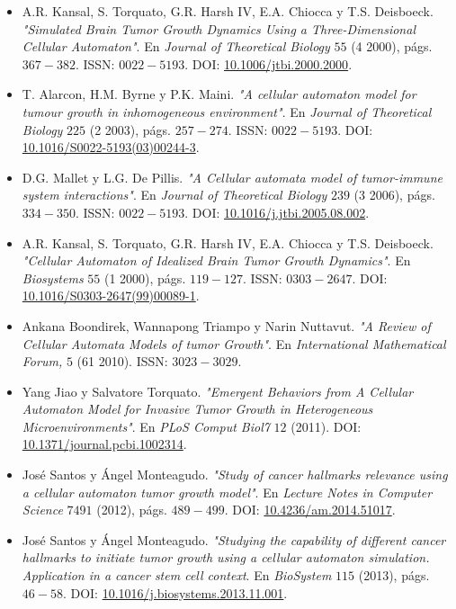 \begin{itemize}
    \item A.R. Kansal, S. Torquato, G.R. Harsh IV, E.A. Chiocca y T.S. Deisboeck.
    \textit{"Simulated Brain Tumor Growth Dynamics Using a Three-Dimensional Cellular Automaton"}.
    En \textit{Journal of Theoretical Biology} $55$ (4 2000), págs. $367 - 382$. ISSN:
    $0022-5193$. DOI: \url{10.1006/jtbi.2000.2000}.
    \item T. Alarcon, H.M. Byrne y P.K. Maini. \textit{"}\textit{A cellular automaton model for tumour growth in inhomogeneous environment"}.
    En \textit{Journal of Theoretical Biology} $225$ (2 2003), págs. $257 - 274$. ISSN:
    $0022-5193$. DOI: \url{10.1016/S0022-5193(03)00244-3}.
    \item D.G. Mallet y L.G. De Pillis. \textit{"}\textit{A Cellular automata model of tumor-immune system interactions"}.
    En \textit{Journal of Theoretical Biology} $239$ (3 2006), págs. $334 - 350$. ISSN:
    $0022-5193$. DOI: \url{10.1016/j.jtbi.2005.08.002}.
    \item  A.R. Kansal, S. Torquato, G.R. Harsh IV, E.A. Chiocca y T.S. Deisboeck.
    \textit{"}\textit{Cellular Automaton of Idealized Brain Tumor Growth Dynamics"}.
    En \textit{Biosystems} $55$ (1 2000), págs. $119 - 127$. ISSN:
    $0303-2647$. DOI: \url{10.1016/S0303-2647(99)00089-1}.
    \item Ankana Boondirek, Wannapong Triampo y Narin Nuttavut.
    \textit{"}\textit{A Review of Cellular Automata Models of tumor Growth"}.
    En \textit{International Mathematical Forum, } $5$ (61 2010). ISSN:
    $3023-3029$.
    \item Yang Jiao y Salvatore Torquato. \textit{"}\textit{Emergent Behaviors from A Cellular Automaton Model for Invasive Tumor Growth in Heterogeneous Microenvironments"}.
    En \textit{PLoS Comput Biol7} $12$ (2011). DOI: \url{10.1371/journal.pcbi.1002314}.
    \item José Santos y Ángel Monteagudo.
    \textit{"}\textit{Study of cancer hallmarks relevance using a cellular automaton tumor growth model"}.
    En \textit{Lecture Notes in Computer Science} $7491$ (2012), págs. $489-499$. DOI: \url{10.4236/am.2014.51017}.
    \item José Santos y Ángel Monteagudo.
    \textit{"}\textit{Studying the capability of different cancer hallmarks to initiate tumor growth using a cellular automaton simulation. Application in a cancer stem cell context}.
    En \textit{BioSystem} $115$ (2013), págs. $46-58$.
    DOI: \url{10.1016/j.biosystems.2013.11.001}.

\end{itemize}
